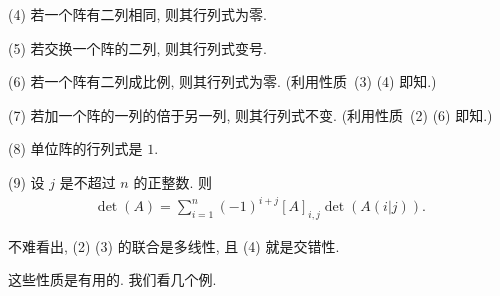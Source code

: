 (4)
若一个阵有二列相同, 则其行列式为零.

(5)
若交换一个阵的二列, 则其行列式变号.

(6)
若一个阵有二列成比例, 则其行列式为零.
(利用性质~(3) (4) 即知.)

(7)
若加一个阵的一列的倍于另一列, 则其行列式不变.
(利用性质~(2) (6) 即知.)

(8)
单位阵的行列式是 \(1\).

(9)
设 \(j\) 是不超过 \(n\) 的正整数.
则
\begin{align*}
    \det {(A)} = \sum_{i = 1}^{n}
    {(-1)^{i+j} [A]_{i,j} \det {(A(i|j))}}.
\end{align*}

\vspace{2ex}

不难看出, (2) (3) 的联合是多线性,
且 (4) 就是交错性.


这些性质是有用的.
我们看几个例.

